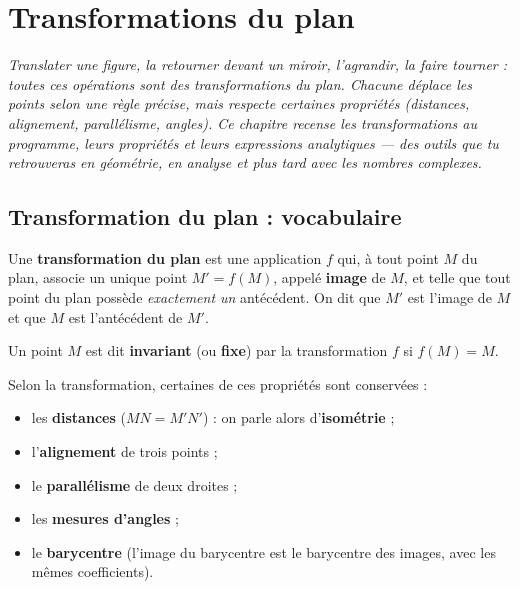 \chapter{Transformations du plan}
\textit{Translater une figure, la retourner devant un miroir, l'agrandir, la faire
tourner : toutes ces opérations sont des \emph{transformations du plan}. Chacune
déplace les points selon une règle précise, mais respecte certaines propriétés
(distances, alignement, parallélisme, angles). Ce chapitre recense les
transformations au programme, leurs propriétés et leurs expressions analytiques —
des outils que tu retrouveras en géométrie, en analyse et plus tard avec les nombres
complexes.}

\section{Transformation du plan : vocabulaire}

\begin{definition}
Une \textbf{transformation du plan} est une application $f$ qui, à tout point $M$ du
plan, associe un unique point $M'=f(M)$, appelé \textbf{image} de $M$, et telle que
tout point du plan possède \emph{exactement un} antécédent. On dit que $M'$ est
l'image de $M$ et que $M$ est l'antécédent de $M'$.
\end{definition}

\begin{definition}
Un point $M$ est dit \textbf{invariant} (ou \textbf{fixe}) par la transformation $f$
si $f(M)=M$.
\end{definition}

\begin{aretenir}
Selon la transformation, certaines de ces propriétés sont conservées :
\begin{itemize}
  \item les \textbf{distances} ($MN = M'N'$) : on parle alors d'\textbf{isométrie} ;
  \item l'\textbf{alignement} de trois points ;
  \item le \textbf{parallélisme} de deux droites ;
  \item les \textbf{mesures d'angles} ;
  \item le \textbf{barycentre} (l'image du barycentre est le barycentre des images,
        avec les mêmes coefficients).
\end{itemize}
\end{aretenir}

